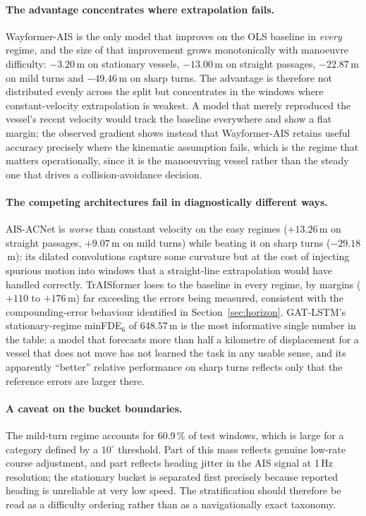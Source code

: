 \documentclass[12pt, a4paper]{article}
\begin{document}
  \paragraph{The advantage concentrates where extrapolation fails.}
  Wayformer-AIS is the only model that improves on the OLS baseline in
  \emph{every} regime, and the size of that improvement grows monotonically with
  manoeuvre difficulty: $-3.20$\,m on stationary vessels, $-13.00$\,m on straight
  passages, $-22.87$\,m on mild turns and $-49.46$\,m on sharp turns.  The
  advantage is therefore not distributed evenly across the split but concentrates
  in the windows where constant-velocity extrapolation is weakest.  A model that
  merely reproduced the vessel's recent velocity would track the baseline
  everywhere and show a flat margin; the observed gradient shows instead that
  Wayformer-AIS retains useful accuracy precisely where the kinematic assumption
  fails, which is the regime that matters operationally, since it is the
  manoeuvring vessel rather than the steady one that drives a collision-avoidance
  decision.

  \paragraph{The competing architectures fail in diagnostically different ways.}
  AIS-ACNet is \emph{worse} than constant velocity on the easy regimes
  ($+13.26$\,m on straight passages, $+9.07$\,m on mild turns) while beating it on
  sharp turns ($-29.18$\,m): its dilated convolutions capture some curvature but
  at the cost of injecting spurious motion into windows that a straight-line
  extrapolation would have handled correctly.  TrAISformer loses to the baseline
  in every regime, by margins ($+110$ to $+176$\,m) far exceeding the errors being
  measured, consistent with the compounding-error behaviour identified in
  Section~\ref{sec:horizon}.  GAT-LSTM's stationary-regime minFDE$_6$ of
  648.57\,m is the most informative single number in the table: a model that
  forecasts more than half a kilometre of displacement for a vessel that does not
  move has not learned the task in any usable sense, and its apparently
  ``better'' relative performance on sharp turns reflects only that the reference
  errors are larger there.

  \paragraph{A caveat on the bucket boundaries.}
  The mild-turn regime accounts for 60.9\,\% of test windows, which is large for a
  category defined by a $10^{\circ}$ threshold.  Part of this mass reflects
  genuine low-rate course adjustment, and part reflects heading jitter in the AIS
  signal at 1\,Hz resolution; the stationary bucket is separated first precisely
  because reported heading is unreliable at very low speed.  The stratification
  should therefore be read as a difficulty ordering rather than as a
  navigationally exact taxonomy.
\end{document}
